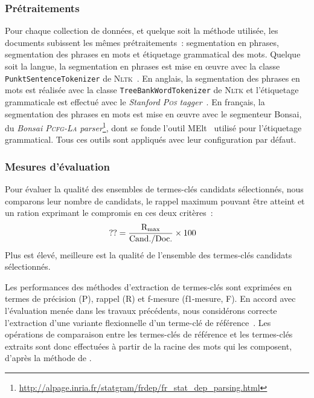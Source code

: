       \subsubsection{Prétraitements}
      \label{subsubsec:main-automatic_keyphrase_annotation-keyphrase_candidate_selection-evaluation-preprocessing}
        Pour chaque collection de données, et quelque soit la méthode utilisée,
        les documents subissent les mêmes prétraitements~: segmentation en
        phrases, segmentation des phrases en mots et étiquetage grammatical des
        mots. Quelque soit la langue, la segmentation en phrases est mise en
        \oe{}uvre avec la classe \texttt{PunktSentenceTokenizer} de
        \textsc{Nltk}~\cite{bird2009nltk}. En anglais, la segmentation des
        phrases en mots est réalisée avec la classe
        \texttt{TreeBankWordTokenizer} de \textsc{Nltk} et l'étiquetage
        grammaticale est effectué avec le \textit{Stanford \textsc{Pos}
        tagger}~\cite{toutanova2003stanfordpostagger}. En français, la
        segmentation des phrases en mots est mise en \oe{}uvre avec le
        segmenteur Bonsai, du \textit{Bonsai \textsc{Pcfg-La}
        parser}\footnote{\url{http://alpage.inria.fr/statgram/frdep/fr_stat_dep_parsing.html}},
        dont se fonde l'outil MElt~\cite{denis2009melt} utilisé pour
        l'étiquetage grammatical. Tous ces outils sont appliqués avec leur
        configuration par défaut.
      
      \subsubsection{Mesures d'évaluation}
      \label{subsubsec:main-automatic_keyphrase_annotation-keyphrase_candidate_selection-evaluation-evaluation_measures}
        Pour évaluer la qualité des ensembles de termes-clés candidats
        sélectionnés, nous comparons leur nombre de candidats, le rappel maximum
        pouvant être atteint et un ration exprimant le compromis en ces deux
        critères~:
        \begin{align}
          ?? &= \frac{\textnormal{R}_{\textnormal{max}}}{\textnormal{Cand./Doc.}} \times 100
        \end{align}
        Plus  est élevé, meilleure est la qualité de l'ensemble des
        termes-clés candidats sélectionnés.

        Les performances des méthodes d'extraction de termes-clés sont exprimées
        en termes de précision (P), rappel (R) et f-mesure (f1-mesure, F). En
        accord avec l'évaluation menée dans les travaux précédents, nous
        considérons correcte l'extraction d'une variante flexionnelle d'un
        terme-clé de référence~\cite{kim2010semeval}. Les opérations de
        comparaison entre les termes-clés de référence et les termes-clés
        extraits sont donc effectuées à partir de la racine des mots qui les
        composent, d'après la méthode de .

